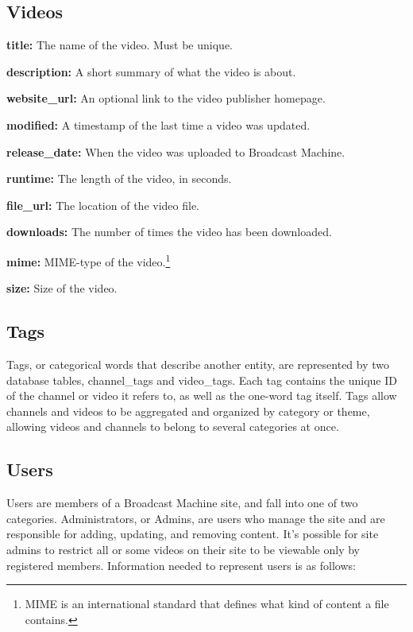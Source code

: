 \documentclass[a4paper,12pt]{report}
\begin{document}
\subsection*{Videos}
\begin{description}
\item{\textbf{title: } The name of the video. Must be unique.}
\item{\textbf{description: } A short summary of what the video is about.}
\item{\textbf{website\_url: } An optional link to the video publisher homepage.}
\item{\textbf{modified: } A timestamp of the last time a video was updated.}
\item{\textbf{release\_date: } When the video was uploaded to Broadcast Machine.}
\item{\textbf{runtime: } The length of the video, in seconds.}
\item{\textbf{file\_url: } The location of the video file.}
\item{\textbf{downloads: } The number of times the video has been downloaded.}
\item{\textbf{mime: } MIME-type of the video.\footnote{MIME is an international standard that defines what kind of content a file contains.}}
\item{\textbf{size: } Size of the video.} \\
\end{description}

\subsection*{Tags}
Tags, or categorical words that describe another entity, are represented by two database tables, channel\_tags and video\_tags. Each tag contains the unique ID of the channel or video it refers to, as well as the one-word tag itself. Tags allow channels and videos to be aggregated and organized by category or theme, allowing videos and channels to belong to several categories at once.

\subsection*{Users}
Users are members of a Broadcast Machine site, and fall into one of two categories. Administrators, or Admins, are users who manage the site and are responsible for adding, updating, and removing content. It's possible for site admins to restrict all or some videos on their site to be viewable only by registered members. Information needed to represent users is as follows:
\end{document}
